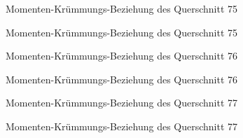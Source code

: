 \documentclass[
  11pt,
  letterpaper,
]{scrreprt}
\begin{document}
\begin{figure}[H]


\caption{\label{fig-qs_75}Momenten-Krümmungs-Beziehung des Querschnitt
75}

\end{figure}%

\begin{figure}[H]


\caption{\label{fig-m_chi_75}Momenten-Krümmungs-Beziehung des
Querschnitt 75}

\end{figure}%

\begin{figure}[H]


\caption{\label{fig-qs_76}Momenten-Krümmungs-Beziehung des Querschnitt
76}

\end{figure}%

\begin{figure}[H]


\caption{\label{fig-m_chi_76}Momenten-Krümmungs-Beziehung des
Querschnitt 76}

\end{figure}%

\begin{figure}[H]


\caption{\label{fig-qs_77}Momenten-Krümmungs-Beziehung des Querschnitt
77}

\end{figure}%

\begin{figure}[H]


\caption{\label{fig-m_chi_77}Momenten-Krümmungs-Beziehung des
Querschnitt 77}

\end{figure}%
\end{document}
